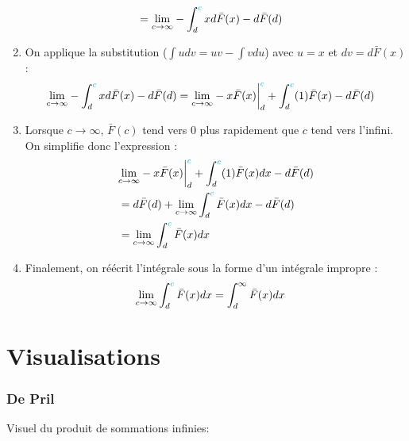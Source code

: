\documentclass[10pt, french]{article}
\begin{document}
\begin{multicols*}{2}
\begin{enumerate}[resume]
\begin{align*}
		&=	\limz{c}{\infty} -\int_{d}^{{\color{cyan}c}} x d\bar{F}(x) - d\bar{F}(d)	
		\end{align*}
	\item	On applique la substitution ($\int udv = uv - \int vdu$) avec $u = x$ et $dv = d\bar{F}(x)$ : 
		\begin{align*}
		\limz{c}{\infty} -\int_{d}^{{\color{cyan}c}} x d\bar{F}(x) - d\bar{F}(d)	
		&=	\limz{c}{\infty} - x\bar{F}(x)\bigg|_{d}^{{\color{cyan}c}} + \int_{d}^{{\color{cyan}c}} (1) \bar{F}(x) - d\bar{F}(d)	
		\end{align*}
	\item	Lorsque $c \rightarrow \infty$, $\bar{F}(c)$ tend vers 0 plus rapidement que $c$ tend vers l'infini. On simplifie donc l'expression : 
		\begin{align*}
		&\limz{c}{\infty} - x\bar{F}(x)\bigg|_{d}^{{\color{cyan}c}} + \int_{d}^{{\color{cyan}c}} (1) \bar{F}(x)dx - d\bar{F}(d)	\\
		&=	d\bar{F}(d) + \limz{c}{\infty} \int_{d}^{{\color{cyan}c}} \bar{F}(x)dx - d\bar{F}(d)	\\
		&=	 \limz{c}{\infty} \int_{d}^{{\color{cyan}c}} \bar{F}(x)dx
		\end{align*}
	\item	Finalement, on réécrit l'intégrale sous la forme d'un intégrale impropre :
		\begin{align*}
		\limz{c}{\infty} \int_{d}^{{\color{cyan}c}} \bar{F}(x)dx
		&=	\int_{d}^{\infty} \bar{F}(x) dx
		\end{align*}
\end{enumerate}


\newpage	
\section{Visualisations}
\subsubsection{De Pril}\label{subsubsec:DePrilVis}
Visuel du produit de sommations infinies: 
\begin{center}
\begin{tikzpicture}[x=0.75pt,y=0.75pt,yscale=-1,xscale=1]


\end{tikzpicture}
\end{center}
\end{multicols*}
\end{document}
